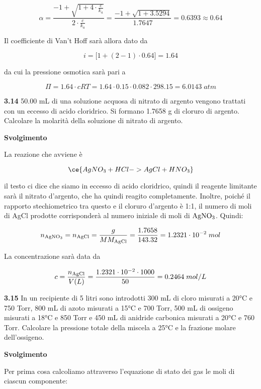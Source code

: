 $$\alpha=\frac{-1 + \sqrt{1 + 4 \cdot \displaystyle \frac{c}{k_a}}}{2 \cdot \displaystyle \frac{c}{k_a}}
=\frac{-1 + \sqrt{1 + 3.5294}}{1.7647}=0.6393\approx0.64$$

Il coefficiente di Van't Hoff sarà allora dato da

$$i=\big[1 + (2-1) \cdot 0.64\big]=1.64$$

da cui la pressione osmotica sarà pari a

$$\Pi=1.64 \cdot cRT
=1.64 \cdot 0.15 \cdot 0.082 \cdot 298.15
=6.0143\;atm$$

\vspace{0.2cm}\textbf{3.14} 50.00 mL di una soluzione acquosa di nitrato di argento vengono trattati con un eccesso di acido
cloridrico. Si formano 1.7658 g di cloruro di argento. Calcolare la molarità della soluzione di nitrato
di argento.

\vspace{0.2cm}\large\textbf{Svolgimento}\normalsize

\vspace{0.2cm}La reazione che avviene è

$$\ce{AgNO_3 + HCl -> AgCl + HNO_3}$$

il testo ci dice che siamo in eccesso di acido cloridrico, quindi il reagente limitante sarà il nitrato d'argento, che ha quindi reagito completamente. Inoltre, poiché il rapporto stechiometrico tra questo e il cloruro d'argento è 1:1, il numero di moli di AgCl prodotte corrisponderà al numero iniziale di moli di $\rm AgNO_3$. Quindi:

$$n_{\rm AgNO_3}=n_{\rm AgCl}=\frac{g}{MM_{\rm AgCl}}
=\frac{1.7658}{143.32}=1.2321 \cdot 10^{-2}\;mol$$

La concentrazione sarà data da

$$c=\frac{n_{\rm AgCl}}{V(L)}
=\frac{1.2321 \cdot 10^{-2} \cdot 1000}{50}
=0.2464\;mol/L$$

\vspace{0.2cm}\textbf{3.15} In un recipiente di 5 litri sono introdotti 300 mL di cloro misurati a 20°C e 750 Torr, 800 mL di azoto misurati a 15°C e 700 Torr, 500 mL di ossigeno misurati a 18°C e 850 Torr e 450 mL di anidride carbonica misurati a 20°C e 760 Torr. Calcolare la pressione totale della miscela a 25°C e la frazione molare dell'ossigeno.

\vspace{0.2cm}\large\textbf{Svolgimento}\normalsize

\vspace{0.2cm}Per prima cosa calcoliamo attraverso l'equazione di stato dei gas le moli di ciascun componente:

